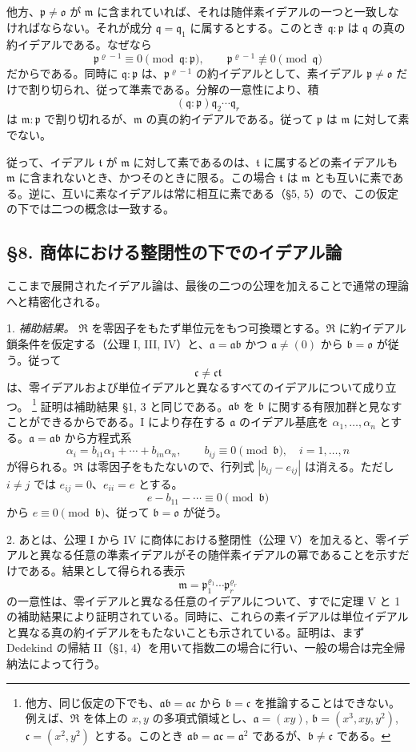 \documentclass[11pt]{article}
\providecommand{\mR}{\mathfrak{R}}
\providecommand{\ma}{\mathfrak{a}}
\providecommand{\mb}{\mathfrak{b}}
\providecommand{\mc}{\mathfrak{c}}
\providecommand{\mm}{\mathfrak{m}}
\providecommand{\mo}{\mathfrak{o}}
\providecommand{\mpideal}{\mathfrak{p}}
\providecommand{\mq}{\mathfrak{q}}
\providecommand{\mt}{\mathfrak{t}}
\begin{document}
他方、$\mpideal\ne\mo$ が $\mm$ に含まれていれば、それは随伴素イデアルの一つと一致しなければならない。それが成分 $\mq=\mq_1$ に属するとする。このとき $\mq:\mpideal$ は $\mq$ の真の約イデアルである。なぜなら
\[
        \mpideal^{\varrho-1}\equiv0\pmod{\mq:\mpideal},\qquad
        \mpideal^{\varrho-1}\not\equiv0\pmod{\mq}
\]
だからである。同時に $\mq:\mpideal$ は、$\mpideal^{\varrho-1}$ の約イデアルとして、素イデアル $\mpideal\ne\mo$ だけで割り切られ、従って準素である。分解の一意性により、積
\[
        (\mq:\mpideal)\mq_2\cdots\mq_r
\]
は $\mm:\mpideal$ で割り切れるが、$\mm$ の真の約イデアルである。従って $\mpideal$ は $\mm$ に対して素でない。

従って、イデアル $\mt$ が $\mm$ に対して素であるのは、$\mt$ に属するどの素イデアルも $\mm$ に含まれないとき、かつそのときに限る。この場合 $\mt$ は $\mm$ とも互いに素である。逆に、互いに素なイデアルは常に相互に素である（§5, 5）ので、この仮定の下では二つの概念は一致する。

\subsection*{§8. 商体における整閉性の下でのイデアル論}

ここまで展開されたイデアル論は、最後の二つの公理を加えることで通常の理論へと精密化される。

1. \emph{補助結果。} $\mR$ を零因子をもたず単位元をもつ可換環とする。$\mR$ に約イデアル鎖条件を仮定する（公理 I, III, IV）と、$\ma=\ma\mb$ かつ $\ma\ne(0)$ から $\mb=\mo$ が従う。従って
\[
        \mc\ne\mc\mt
\]
は、零イデアルおよび単位イデアルと異なるすべてのイデアルについて成り立つ。
\footnote{他方、同じ仮定の下でも、$\ma\mb=\ma\mc$ から $\mb=\mc$ を推論することはできない。例えば、$\mR$ を体上の $x,y$ の多項式領域とし、$\ma=(xy)$, $\mb=(x^3,xy,y^2)$, $\mc=(x^2,y^2)$ とする。このとき $\ma\mb=\ma\mc=\ma^2$ であるが、$\mb\ne\mc$ である。}
証明は補助結果 §1, 3 と同じである。$\ma\mb$ を $\mb$ に関する有限加群と見なすことができるからである。I により存在する $\ma$ のイデアル基底を $\alpha_1,\ldots,\alpha_n$ とする。$\ma=\ma\mb$ から方程式系
\[
        \alpha_i=b_{i1}\alpha_1+\cdots+b_{in}\alpha_n,
        \qquad b_{ij}\equiv0\pmod{\mb},\quad i=1,\ldots,n
\]
が得られる。$\mR$ は零因子をもたないので、行列式 $|b_{ij}-e_{ij}|$ は消える。ただし $i\ne j$ では $e_{ij}=0$、$e_{ii}=e$ とする。
\[
        e-b_{11}-\cdots\equiv0\pmod{\mb}
\]
から $e\equiv0\pmod{\mb}$、従って $\mb=\mo$ が従う。

2. あとは、公理 I から IV に商体における整閉性（公理 V）を加えると、零イデアルと異なる任意の準素イデアルがその随伴素イデアルの冪であることを示すだけである。結果として得られる表示
\[
        \mm=\mpideal_1^{\varrho_1}\cdots\mpideal_r^{\varrho_r}
\]
の一意性は、零イデアルと異なる任意のイデアルについて、すでに定理 V と 1 の補助結果により証明されている。同時に、これらの素イデアルは単位イデアルと異なる真の約イデアルをもたないことも示されている。証明は、まず Dedekind の帰結 II（§1, 4）を用いて指数二の場合に行い、一般の場合は完全帰納法によって行う。
\end{document}
